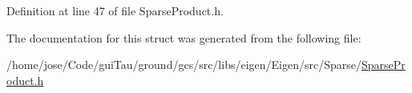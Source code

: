 Definition at line 47 of file Sparse\-Product.\-h.



The documentation for this struct was generated from the following file\-:\begin{DoxyCompactItemize}
\item 
/home/jose/\-Code/gui\-Tau/ground/gcs/src/libs/eigen/\-Eigen/src/\-Sparse/\hyperlink{_sparse_product_8h}{Sparse\-Product.\-h}\end{DoxyCompactItemize}
